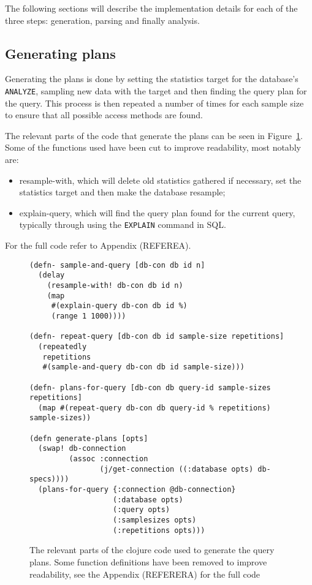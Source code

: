 The following sections will describe the implementation details for each of the
three steps: generation, parsing and finally analysis.

\subsection{Generating plans}\label{sec:generatingplans}
Generating the plans is done by setting the statistics target for the database's
\texttt{ANALYZE}, sampling new data with the target and then finding the query plan for
the query. This process is then repeated a number of times for each sample size
to ensure that all possible access methods are found.

The relevant parts of the code that generate the plans can be seen in
Figure~\ref{fig:clj:generating}. Some of the functions used have been cut to
improve readability, most notably are:
\begin{itemize}
\item resample-with, which will delete old statistics gathered if necessary, set
  the statistics target and then make the database resample;
\item explain-query, which will find the query plan found for the current query,
  typically through using the \texttt{EXPLAIN} command in SQL.
\end{itemize}
For the full code refer to Appendix (REFEREA).

\begin{figure}[ht]
  \begin{verbatim}
(defn- sample-and-query [db-con db id n]
  (delay
    (resample-with! db-con db id n)
    (map
     #(explain-query db-con db id %)
     (range 1 1000))))

(defn- repeat-query [db-con db id sample-size repetitions]
  (repeatedly
   repetitions
   #(sample-and-query db-con db id sample-size)))

(defn- plans-for-query [db-con db query-id sample-sizes repetitions]
  (map #(repeat-query db-con db query-id % repetitions) sample-sizes))

(defn generate-plans [opts]
  (swap! db-connection
         (assoc :connection
                (j/get-connection ((:database opts) db-specs))))
  (plans-for-query {:connection @db-connection}
                   (:database opts)
                   (:query opts)
                   (:samplesizes opts)
                   (:repetitions opts)))
   \end{verbatim}
   \caption[The clojure code to generate a query]{The relevant parts of the
     clojure code used to generate the query plans. Some function definitions
     have been removed to improve readability, see the Appendix (REFERERA) for
     the full code}
\label{fig:clj:generating}
\end{figure}

